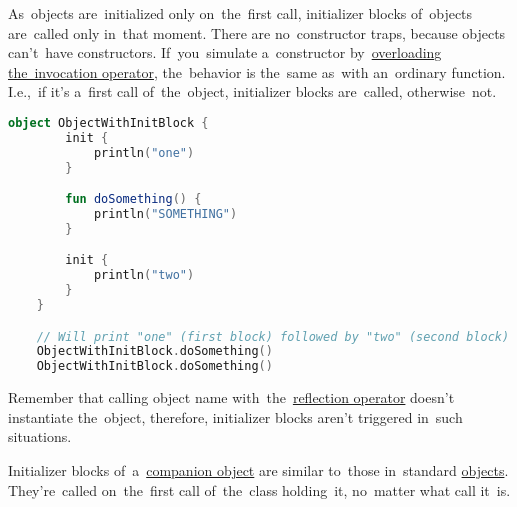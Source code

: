 \label{objectinitblock}
As~objects are~initialized only on~the~first call, initializer blocks of~objects are~called only in~that moment.
There are no~constructor traps, because objects can't~have constructors.
If~you~simulate a~constructor by~\hyperref[kotlininvokeoverload]{overloading the~invocation operator}, the~behavior is the~same as~with an~ordinary function.
I.e.,~if it's a~first call of~the~object, initializer blocks are~called, otherwise~not.

\begin{lstlisting}[language=Kotlin]
    object ObjectWithInitBlock {
        init {
            println("one")
        }

        fun doSomething() {
            println("SOMETHING")
        }

        init {
            println("two")
        }
    }

    // Will print "one" (first block) followed by "two" (second block) followed by "SOMETHING" twice (two calls of the function)
    ObjectWithInitBlock.doSomething()
    ObjectWithInitBlock.doSomething()
\end{lstlisting}

\warning Remember that calling object name with~the~\hyperref[kotlinreflection]{reflection operator} doesn't instantiate the~object, therefore, initializer blocks aren't triggered in~such situations.

Initializer blocks of~a~\hyperref[kotlincompanionobject]{companion object} are similar to~those in~standard \hyperref[kotlinobject]{objects}.
They're~called on~the~first call of~the~class holding~it, no~matter what call it~is.
